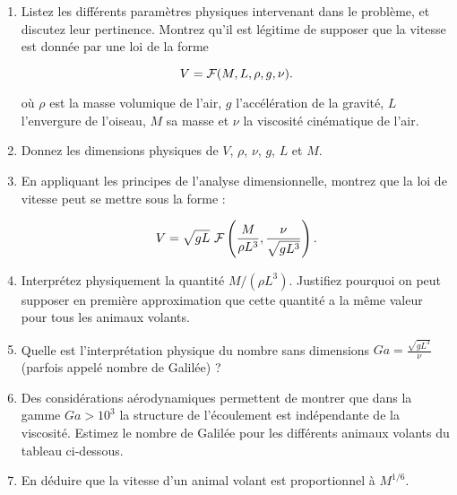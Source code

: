 \begin{enumerate}

\item 

Listez les différents paramètres physiques intervenant dans le problème, et discutez leur pertinence. Montrez qu'il est légitime de supposer que la vitesse est donnée par une loi de la forme 

$$
V = {\cal F}(M,L,\rho,g,\nu).
$$

où $\rho$ est la masse volumique de l'air, $g$ l'accélération de la gravité,
$L$ l'envergure de l'oiseau, $M$ sa masse et $\nu$ la viscosité cinématique de l'air.



\item Donnez les dimensions physiques de $V$, $\rho$, $\nu$, $g$, $L$ et $M$.

\item En appliquant les principes de l'analyse dimensionnelle, montrez
que la loi de vitesse peut se mettre sous la forme :

$$
V = \sqrt{gL} \,\, {\cal F} \left(\frac{M}{\rho L^3},\frac{\nu}{\sqrt{g L^3}}\right).
$$

 \item Interprétez physiquement la quantité $M/ (\rho L^3)$. Justifiez pourquoi
on peut supposer en première approximation que cette quantité a la même valeur
pour tous les animaux volants.
 
\item Quelle est l'interprétation physique du nombre sans dimensions $Ga= \frac{\sqrt{g L^3}}{\nu}$ (parfois appelé nombre de Galilée) ?

\item 
Des considérations aérodynamiques permettent de montrer que dans la gamme
$Ga > 10^3$ la structure de l'écoulement est indépendante de la viscosité. Estimez le nombre de Galilée pour les différents animaux volants du tableau ci-dessous.  



\item En déduire que  la vitesse d'un animal volant est proportionnel à
$M^{1/6}$.



\end{enumerate}
